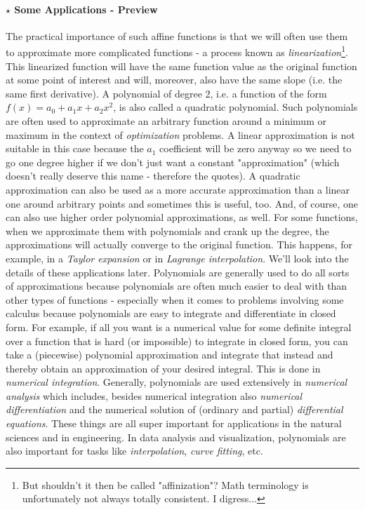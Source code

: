 \paragraph{$\star$ Some Applications - Preview}
The practical importance of such affine functions is that we will often use them to approximate more complicated functions - a process known as \emph{linearization}\footnote{But shouldn't it then be called "affinization"? Math terminology is unfortunately not always totally consistent. I digress...}. This linearized function will have the same function value as the original function at some point of interest and will, moreover, also have the same slope (i.e. the same first derivative). A polynomial of degree 2, i.e. a function of the form $f(x) = a_0 + a_1 x + a_2 x^2$, is also called a quadratic polynomial. Such polynomials are often used to approximate an arbitrary function around a minimum or maximum in the context of \emph{optimization} problems. A linear approximation is not suitable in this case because the $a_1$ coefficient will be zero anyway so we need to go one degree higher if we don't just want a constant "approximation" (which doesn't really deserve this name - therefore the quotes). A quadratic approximation can also be used as a more accurate approximation than a linear one around arbitrary points and sometimes this is useful, too. And, of course, one can also use higher order polynomial approximations, as well. For some functions, when we approximate them with polynomials and crank up the degree, the approximations will actually converge to the original function. This happens, for example, in a \emph{Taylor expansion} or in \emph{Lagrange interpolation}. We'll look into the details of these applications later. Polynomials are generally used to do all sorts of approximations because polynomials are often much easier to deal with than other types of functions - especially when it comes to problems involving some calculus because polynomials are easy to integrate and differentiate in closed form. For example, if all you want is a numerical value for some definite integral over a function that is hard (or impossible) to integrate in closed form, you can take a (piecewise) polynomial approximation and integrate that instead and thereby obtain an approximation of your desired integral. This is done in \emph{numerical integration}. Generally, polynomials are used extensively in \emph{numerical analysis} which includes, besides numerical integration also \emph{numerical differentiation} and the numerical solution of (ordinary and partial) \emph{differential equations}. These things are all super important for applications in the natural sciences and in engineering. In data analysis and visualization, polynomials are also important for tasks like \emph{interpolation}, \emph{curve fitting}, etc.

